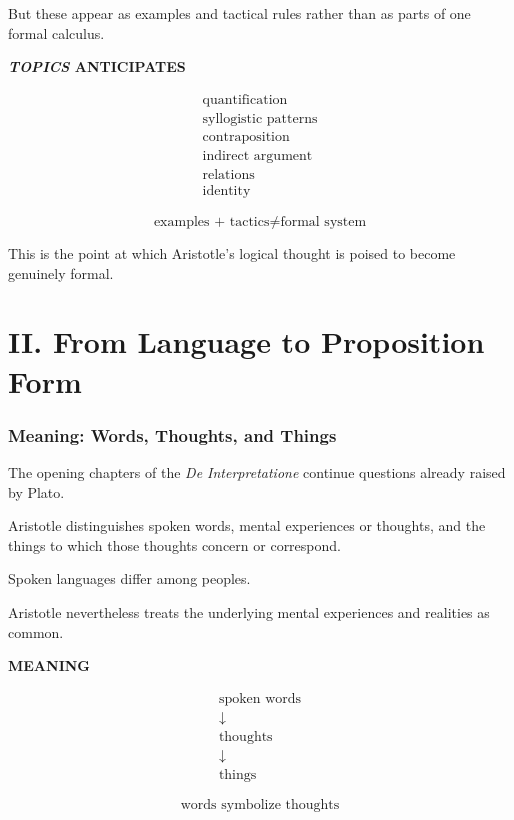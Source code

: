 \documentclass[11pt]{article}
\begin{document}
But these appear as examples and tactical rules rather than as
parts of one formal calculus.

\begin{whiteboard}
\textbf{\textit{TOPICS} ANTICIPATES}

\[
\begin{array}{c}
\text{quantification}\\
\text{syllogistic patterns}\\
\text{contraposition}\\
\text{indirect argument}\\
\text{relations}\\
\text{identity}
\end{array}
\]

\[
\boxed{
\text{examples + tactics}
\neq
\text{formal system}
}
\]
\end{whiteboard}

This is the point at which Aristotle's logical thought is poised
to become genuinely formal.


\part*{II. From Language to Proposition Form}

\section{Meaning: Words, Thoughts, and Things}

The opening chapters of the \textit{De Interpretatione} continue
questions already raised by Plato.

Aristotle distinguishes spoken words, mental experiences or
thoughts, and the things to which those thoughts concern or
correspond.

Spoken languages differ among peoples.

Aristotle nevertheless treats the underlying mental experiences
and realities as common.

\begin{whiteboard}
\textbf{MEANING}

\[
\begin{array}{c}
\text{spoken words}\\
\downarrow\\
\text{thoughts}\\
\downarrow\\
\text{things}
\end{array}
\]

\[
\text{words symbolize thoughts}
\]
\end{whiteboard}
\end{document}
